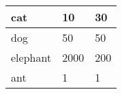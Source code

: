 \begin{tabular}{lll}
    cat & 10 & 30 \\ \hline
    dog & 50 & 50 \\ \hline
    elephant & 2000 & 200 \\ \hline
    ant & 1 & 1
\end{tabular}
